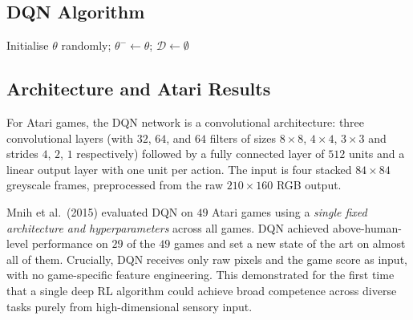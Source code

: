 \subsection{DQN Algorithm}

\begin{algorithm}[ht]
\caption{Deep Q-Network (DQN)}
\label{alg:dqn}
Initialise $\theta$ randomly; $\theta^- \leftarrow \theta$; $\mathcal{D} \leftarrow \emptyset$\;
\end{algorithm}

\subsection{Architecture and Atari Results}

For Atari games, the DQN network is a convolutional architecture: three convolutional layers
(with $32$, $64$, and $64$ filters of sizes $8\times 8$, $4\times 4$, $3\times 3$ and strides
$4$, $2$, $1$ respectively) followed by a fully connected layer of $512$ units and a linear output
layer with one unit per action.  The input is four stacked $84\times 84$ greyscale frames,
preprocessed from the raw $210\times 160$ RGB output.

Mnih et al.~(2015) evaluated DQN on $49$ Atari games using a \emph{single fixed architecture
and hyperparameters} across all games.  DQN achieved above-human-level performance on $29$ of the
$49$ games and set a new state of the art on almost all of them.  Crucially, DQN receives only
raw pixels and the game score as input, with no game-specific feature engineering.  This
demonstrated for the first time that a single deep RL algorithm could achieve broad competence
across diverse tasks purely from high-dimensional sensory input.


